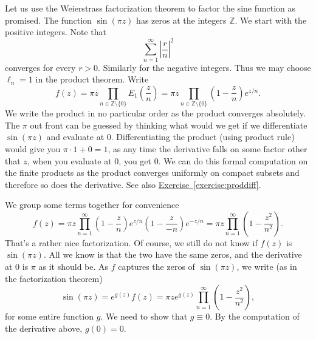 \documentclass[12pt,openany]{book}
\newcommand{\abs}[1]{\left\lvert {#1} \right\rvert}
\newcommand{\Z}{{\mathbb{Z}}}
\theoremstyle{plain}
\theoremstyle{remark}
\theoremstyle{definition}
\theoremstyle{exercise}
\theoremstyle{example}
\newcommand{\exerciseref}[1]{\hyperref[#1]{Exercise~\ref*{#1}}}
\begin{document}
Let us use the Weierstrass factorization theorem to factor the sine function
as promised.  The function $\sin(\pi z)$ has zeros at the integers $\Z$.
We start with the positive integers.  Note that
\begin{equation*}
\sum_{n=1}^\infty \abs{\frac{r}{n}}^{2}
\end{equation*}
converges for every $r > 0$.  Similarly for the negative integers.  Thus we
may choose $\ell_n =1$ in the product theorem.  Write
\begin{equation*}
f(z) =
\pi z \prod_{n \in \Z \setminus \{ 0 \}} E_1\left(\frac{z}{n}\right)
= 
\pi z \prod_{n \in \Z \setminus \{ 0 \}} \left(1-\frac{z}{n}\right) e^{z/n} .
\end{equation*}
We write the product in no particular order as the product converges
absolutely.
The $\pi$ out front can be guessed by thinking what would we get if we
differentiate $\sin(\pi z)$ and evaluate at $0$.
Differentiating the product (using product rule) would give you $\pi \cdot 1
+ 0=1$, as any time the derivative falls on some factor other that $z$, when
you evaluate at $0$, you get $0$.  We can do this formal computation on the
finite products as the product converges uniformly on compact subsets and
therefore so does the derivative.  See also \exerciseref{exercise:proddiff}.

We group some terms together for convenience
\begin{equation*}
f(z) =
\pi z \prod_{n=1}^\infty 
\left(1-\frac{z}{n}\right) e^{z/n}
\left(1-\frac{z}{-n}\right) e^{-z/n}
=
\pi z \prod_{n=1}^\infty 
\left(1-\frac{z^2}{n^2}\right) .
\end{equation*}
That's a rather nice factorization.  Of course, we still do not know if $f(z)$ is
$\sin(\pi z)$.
All we know is that the two have the same zeros,
and the derivative at $0$ is $\pi$ as it should be.
As $f$ captures the zeros of $\sin(\pi z)$, we write
(as in the factorization theorem)
\begin{equation*}
\sin(\pi z)
= 
e^{g(z)} f(z)
=
\pi z
e^{g(z)}
\prod_{n=1}^\infty 
\left(1-\frac{z^2}{n^2}\right) ,
\end{equation*}
for some entire function $g$.  We need to show that $g \equiv 0$.  By the
computation of the derivative above, $g(0) = 0$.
\end{document}

